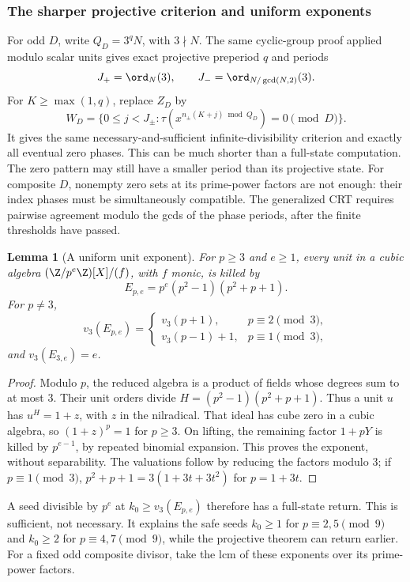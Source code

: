 \documentclass[11pt,a4paper]{article}
\newtheorem{lemma}[theorem]{Lemma}\newtheorem{proposition}[theorem]{Proposition}
\theoremstyle{definition}\newtheorem{definition}[theorem]{Definition}
\theoremstyle{remark}\newtheorem{remark}[theorem]{Remark}
\begin{document}
\subsubsection{The sharper projective criterion and uniform exponents}

For odd $D$, write $Q_D=3^qN$, with $3\nmid N$.
The same cyclic-group proof applied modulo scalar units gives exact
projective preperiod $q$ and periods
\begin{equation}\label{R15:eq:projective-periods}
 J_+=\ord_N(3),\qquad J_-=\ord_{N/\gcd(N,2)}(3).
\end{equation}
For $K\ge\max(1,q)$, replace $Z_D$ by
\[
 W_D=\{0\le j<J_\pm:
 \tau(x^{n_\pm(K+j)\bmod Q_D})=0\pmod D\}.
\]
It gives the same necessary-and-sufficient infinite-divisibility
criterion and exactly all eventual zero phases. This can be much
shorter than a full-state computation. The zero pattern may still
have a smaller period than its projective state.
For composite $D$, nonempty zero sets at its prime-power factors
are not enough: their index phases must be simultaneously compatible.
The generalized CRT requires pairwise agreement modulo the gcds of
the phase periods, after the finite thresholds have passed.

\begin{lemma}[A uniform unit exponent]\label{R15:lem:universal}
For $p\ge3$ and $e\ge1$, every unit in a cubic algebra
$(\Z/p^e\Z)[X]/(f)$, with $f$ monic, is killed by
\[
 E_{p,e}=p^e(p^2-1)(p^2+p+1).
\]
For $p\ne3$,
\[
 v_3(E_{p,e})=
 \begin{cases}v_3(p+1),&p\equiv2\pmod3,\\
 v_3(p-1)+1,&p\equiv1\pmod3,
 \end{cases}
\]
and $v_3(E_{3,e})=e$.
\end{lemma}
\begin{proof}
Modulo $p$, the reduced algebra is a product of fields whose degrees
sum to at most $3$. Their unit orders divide
$H=(p^2-1)(p^2+p+1)$. Thus a unit $u$ has $u^H=1+z$, with
$z$ in the nilradical. That ideal has cube zero in a cubic algebra,
so $(1+z)^p=1$ for $p\ge3$. On lifting, the remaining factor
$1+pY$ is killed by $p^{e-1}$, by repeated binomial expansion.
This proves the exponent, without separability. The valuations follow
by reducing the factors modulo $3$; if $p\equiv1\pmod3$,
$p^2+p+1=3(1+3t+3t^2)$ for $p=1+3t$.
\end{proof}

A seed divisible by $p^e$ at $k_0\ge v_3(E_{p,e})$ therefore
has a full-state return. This is sufficient, not necessary.
It explains the safe seeds $k_0\ge1$ for $p\equiv2,5\pmod9$
and $k_0\ge2$ for $p\equiv4,7\pmod9$, while the projective
theorem can return earlier. For a fixed odd composite divisor,
take the lcm of these exponents over its prime-power factors.
\end{document}
